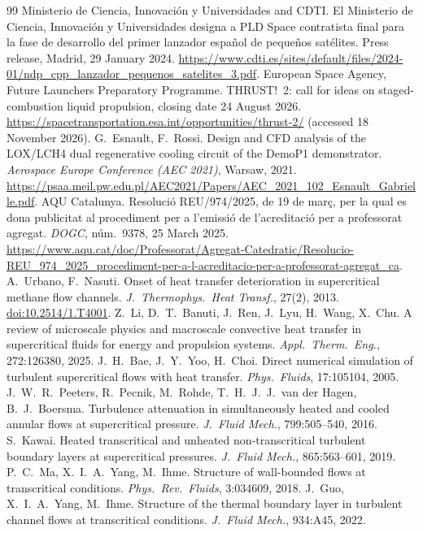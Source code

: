 \documentclass[11pt]{article}
\begin{document}
\begin{thebibliography}{99}
 Ministerio de Ciencia, Innovaci\'on y Universidades and CDTI. El Ministerio de Ciencia, Innovaci\'on y Universidades designa a PLD Space contratista final para la fase de desarrollo del primer lanzador espa\~nol de peque\~nos sat\'elites. Press release, Madrid, 29 January 2024. \url{https://www.cdti.es/sites/default/files/2024-01/ndp_cpp_lanzador_pequenos_satelites_3.pdf}.
 European Space Agency, Future Launchers Preparatory Programme. THRUST!~2: call for ideas on staged-combustion liquid propulsion, closing date 24 August 2026. \url{https://spacetransportation.esa.int/opportunities/thrust-2/} (accessed 18 November 2026).
 G.\ Esnault, F.\ Rossi. Design and CFD analysis of the LOX/LCH4 dual regenerative cooling circuit of the DemoP1 demonstrator. \emph{Aerospace Europe Conference (AEC 2021)}, Warsaw, 2021. \url{https://psaa.meil.pw.edu.pl/AEC2021/Papers/AEC_2021_102_Esnault_Gabrielle.pdf}.
 AQU Catalunya. Resoluci\'o REU/974/2025, de 19 de mar\c{c}, per la qual es dona publicitat al procediment per a l'emissi\'o de l'acreditaci\'o per a professorat agregat. \emph{DOGC}, n\'um.~9378, 25 March 2025. \url{https://www.aqu.cat/doc/Professorat/Agregat-Catedratic/Resolucio-REU_974_2025_procediment-per-a-l-acreditacio-per-a-professorat-agregat_ca}.
 A.\ Urbano, F.\ Nasuti. Onset of heat transfer deterioration in supercritical methane flow channels. \emph{J.\ Thermophys.\ Heat Transf.}, 27(2), 2013. \href{https://doi.org/10.2514/1.T4001}{doi:10.2514/1.T4001}.
 Z.\ Li, D.\ T.\ Banuti, J.\ Ren, J.\ Lyu, H.\ Wang, X.\ Chu. A review of microscale physics and macroscale convective heat transfer in supercritical fluids for energy and propulsion systems. \emph{Appl.\ Therm.\ Eng.}, 272:126380, 2025.
 J.\ H.\ Bae, J.\ Y.\ Yoo, H.\ Choi. Direct numerical simulation of turbulent supercritical flows with heat transfer. \emph{Phys.\ Fluids}, 17:105104, 2005.
 J.\ W.\ R.\ Peeters, R.\ Pecnik, M.\ Rohde, T.\ H.\ J.\ J.\ van der Hagen, B.\ J.\ Boersma. Turbulence attenuation in simultaneously heated and cooled annular flows at supercritical pressure. \emph{J.\ Fluid Mech.}, 799:505--540, 2016.
 S.\ Kawai. Heated transcritical and unheated non-transcritical turbulent boundary layers at supercritical pressures. \emph{J.\ Fluid Mech.}, 865:563--601, 2019.
 P.\ C.\ Ma, X.\ I.\ A.\ Yang, M.\ Ihme. Structure of wall-bounded flows at transcritical conditions. \emph{Phys.\ Rev.\ Fluids}, 3:034609, 2018.
 J.\ Guo, X.\ I.\ A.\ Yang, M.\ Ihme. Structure of the thermal boundary layer in turbulent channel flows at transcritical conditions. \emph{J.\ Fluid Mech.}, 934:A45, 2022.

\end{thebibliography}
\end{document}
